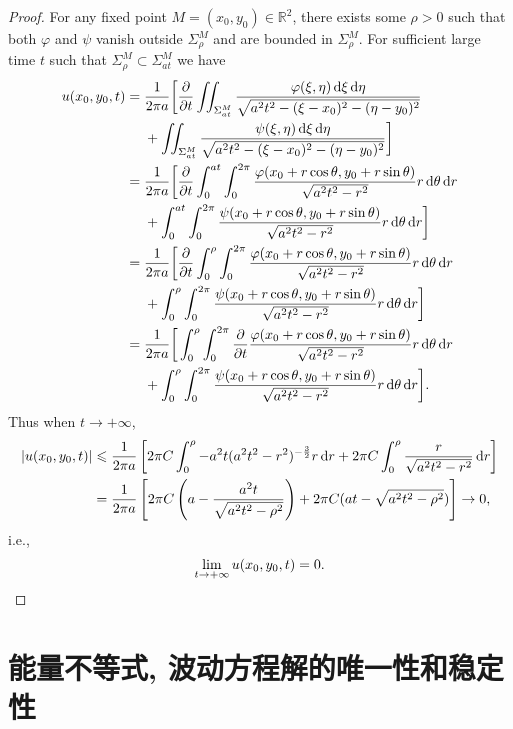 \begin{proof}
  For any fixed point $M=(x_0,y_0)\in\mathbb{R}^2$, there exists some $\rho>0$
  such that both $\varphi$ and $\psi$ vanish outside $\Sigma_\rho^M$ and are
  bounded in $\Sigma_\rho^M$.
  For sufficient large time $t$ such that $\Sigma_\rho^M\subset \Sigma_{at}^M$ we have
  \begin{align*}
    u(x_0,y_0,t) = {} 
    & \frac{1}{2\pi a}\biggl[\frac{\partial}{\partial t}
      \iint_{\Sigma_{at}^M}
      \frac{\varphi(\xi,\eta)\diff\xi\diff\eta}{\sqrt{a^2t^2-(\xi-x_0)^2-(\eta-y_0)^2}} \\
    & + \iint_{\Sigma_{at}^M}\frac{\psi(\xi,\eta)\diff\xi\diff\eta}
      {\sqrt{a^2t^2-(\xi-x_0)^2-(\eta-y_0)^2}}\biggr] \\
={} & \frac{1}{2\pi a}\bigg[\frac{\partial}{\partial t}\int_0^{at}\int_0^{2\pi}
      \frac{\varphi(x_0+r\cos\theta,y_0+r\sin\theta)}{\sqrt{a^2t^2-r^2}}r\diff\theta\diff r \\
    & +\int_0^{at}\int_0^{2\pi}\frac{\psi(x_0+r\cos\theta,y_0+r\sin\theta)}
      {\sqrt{a^2t^2-r^2}}r\diff\theta\diff r\bigg] \\
={} & \frac{1}{2\pi a}\bigg[\frac{\partial}{\partial t}
      \int_0^{\rho}\int_0^{2\pi}\frac{\varphi(x_0+r\cos\theta,y_0+r\sin\theta)}
      {\sqrt{a^2t^2-r^2}}r\diff\theta\diff r \\
    & + \int_0^{\rho}\int_0^{2\pi}\frac{\psi(x_0+r\cos\theta,y_0+r\sin\theta)}{\sqrt{a^2t^2-r^2}}r\diff\theta\diff r\bigg] \\
={} & \frac{1}{2\pi a}\bigg[\int_0^{\rho}\int_0^{2\pi}\frac{\partial}{\partial t}
      \frac{\varphi(x_0+r\cos\theta,y_0+r\sin\theta)}{\sqrt{a^2t^2-r^2}}r\diff\theta\diff r \\
    & + \int_0^{\rho}\int_0^{2\pi}\frac{\psi(x_0+r\cos\theta,y_0+r\sin\theta)}
      {\sqrt{a^2t^2-r^2}}r\diff\theta\diff r\bigg].
  \end{align*}
  Thus when $t\to +\infty$,
  \[\begin{split}
  |u(x_0,y_0,t)|&\leqslant \frac{1}{2\pi a}\left[2\pi C\int_0^{\rho}-a^2t(a^2t^2-r^2)^{-\frac{3}{2}}r\mathop{}\!\mathrm{d} r+2\pi C\int_0^{\rho}\frac{r}{\sqrt{a^2t^2-r^2}}\mathop{}\!\mathrm{d} r\right]\\
  &=\frac{1}{2\pi a}\left[2\pi C\left(a-\frac{a^2t}{\sqrt{a^2t^2-\rho^2}}\right)+2\pi C(at-\sqrt{a^2t^2-\rho^2})\right]\to 0,
  \end{split}\]
  i.e.,
  \[\lim_{t\to+\infty}u(x_0,y_0,t) = 0.\qedhere\]
\end{proof}


\section{能量不等式, 波动方程解的唯一性和稳定性}

